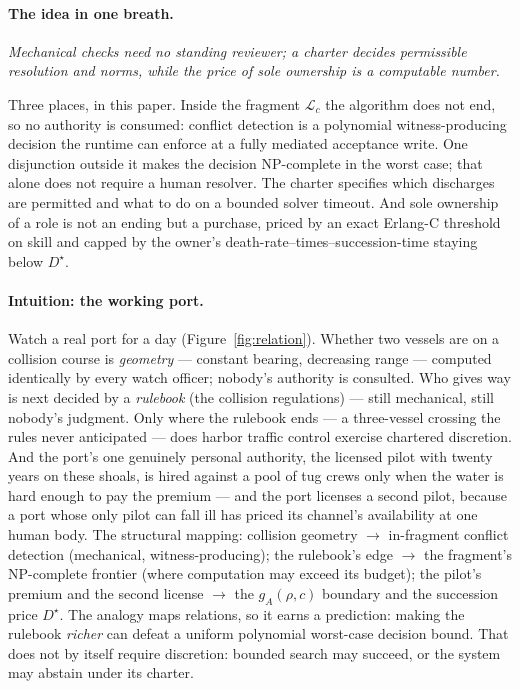 \documentclass[11pt,a4paper]{article}
\newcommand{\onebreath}[1]{\begin{center}\emph{#1}\end{center}}
\begin{document}
\paragraph{The idea in one breath.}
\onebreath{Mechanical checks need no standing reviewer; a charter decides permissible resolution and norms, while the price
of sole ownership is a computable number.}
\noindent Three places, in this paper. Inside the fragment $\mathcal{L}_c$ the algorithm does not end, so no authority is consumed:
conflict detection is a polynomial witness-producing decision the runtime can enforce at a fully mediated acceptance write.
One disjunction outside it makes the decision NP-complete in the worst case; that alone does not require a human resolver.
The charter specifies which discharges are permitted and what to do on a bounded solver timeout. And sole
ownership of a role is not an ending but a purchase, priced by an exact Erlang-C threshold on skill and capped by the owner's
death-rate--times--succession-time staying below $D^\star$.

\paragraph{Intuition: the working port.} Watch a real port for a day (Figure~\ref{fig:relation}). Whether two vessels are on a
collision course is \emph{geometry} --- constant bearing, decreasing range --- computed identically by every watch officer;
nobody's authority is consulted. Who gives way is next decided by a \emph{rulebook} (the collision regulations) --- still
mechanical, still nobody's judgment. Only where the rulebook ends --- a three-vessel crossing the rules never anticipated --- does
harbor traffic control exercise chartered discretion. And the port's one genuinely personal authority, the licensed pilot with
twenty years on these shoals, is hired against a pool of tug crews only when the water is hard enough to pay the premium ---
and the port licenses a second pilot, because a port whose only pilot can fall ill has priced its channel's availability at one
human body. The structural mapping: collision geometry $\to$ in-fragment conflict detection (mechanical, witness-producing);
the rulebook's edge $\to$ the fragment's NP-complete frontier (where computation may exceed its budget); the pilot's premium and the
second license $\to$ the $g_A(\rho,c)$ boundary and the succession price $D^\star$. The analogy maps relations, so it earns a
prediction: making the rulebook \emph{richer} can defeat a uniform polynomial worst-case decision bound. That does not by
itself require discretion: bounded search may succeed, or the system may abstain under its charter.
\end{document}

